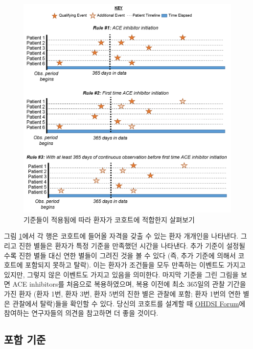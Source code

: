 \documentclass[11pt]{book}
\theoremstyle{definition}
\theoremstyle{definition}
\theoremstyle{definition}
\theoremstyle{remark}
\begin{document}
\begin{figure}

{\centering \includegraphics[width=1\linewidth]{images/Cohorts/EarliestEventExplained} 

}

\caption{기준들이 적용됨에 따라 환자가 코호트에 적합한지 살펴보기}\label{fig:EarliestEventExplained}
\end{figure}

그림 \ref{fig:EarliestEventExplained}에서 각 행은 코호트에 들어올 자격을
갖출 수 있는 환자 개개인을 나타낸다. 그리고 진한 별들은 환자가 특정
기준을 만족했던 시간을 나타낸다. 추가 기준이 설정될수록 진한 별들 대신
연한 별들이 그려진 것을 볼 수 있다 (즉, 추가 기준에 의해서 코호트에
포함되지 못하고 탈락). 이는 환자가 조건들을 모두 만족하는 이벤트도
가지고 있지만, 그렇지 않은 이벤트도 가지고 있음을 의미한다. 마지막
기준을 그린 그림을 보면 ACE inhibitors를 처음으로 복용하였으며, 복용
이전에 최소 365일의 관찰 기간을 가진 환자 (환자 1번, 환자 3번, 환자
5번의 진한 별은 관찰에 포함; 환자 1번의 연한 별은 관찰에서 탈락)들을
확인할 수 있다. 당신의 코호트를 설계할 때
\href{http://forums.ohdsi.org}{OHDSI Forum}에 참여하는 연구자들의 의견을
참고하면 더 좋을 것이다.

\subsection{포함 기준}\label{-}
\end{document}
